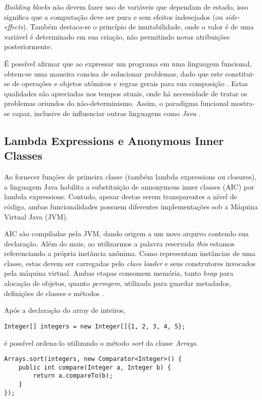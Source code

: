 \documentclass[10pt, conference]{IEEEtran}
\begin{document}
\textit{Building blocks} não devem fazer uso de variáveis que dependam de estado, isso significa que a computação deve ser pura e sem efeitos indesejados (ou \textit{side-effects}). Também destaca-se o princípio de imutabilidade, onde o valor é de uma variável é determinado em sua criação, não permitindo novas atribuições posteriormente.

É possível afirmar que ao expressar um programa em uma linguagem funcional, obtem-se uma maneira concisa de solucionar problemas, dado que este constitui-se de operações e objetos atômicos e regras gerais para sua composição \cite{michaelson2011introduction}. Estas qualidades são apreciadas nos tempos atuais, onde há necessidade de tratar os problemas oriundos do não-determinismo. Assim, o paradigma funcional mostra-se capaz, inclusive de influenciar outras linguagens como \textit{Java} \cite{jsr335}.

\subsection{Lambda Expressions e Anonymous Inner Classes}
Ao fornecer funções de primeira classe (também lambda expressions ou closures), a linguagem Java habilita a substituição de annonymous inner classes (AIC) por lambda expressions. Contudo, apesar destas serem transparentes a nível de código, ambas funcionalidades possuem diferentes implementações sob a Máquina Virtual Java (JVM).

AIC são compiladas pela JVM, dando origem a um novo arquivo contendo sua declaração. Além do mais, ao utilizarmos a palavra reservada \textit{this} estamos referenciando a própria instância anônima. Como representam instâncias de uma classe, estas devem ser carregadas pelo \textit{class loader} e seus construtores invocados pela máquina virtual. Ambas etapas consomem memória, tanto \textit{heap} para alocação de objetos, quanto \emph{permgem}, utilizada para guardar metadados, definições de classes e métodos \cite{hunt2011java}.

Após a declaração do array de inteiros,

\begin{lstlisting}[caption={Array de Inteiros}]
Integer[] integers = new Integer[]{1, 2, 3, 4, 5};
\end{lstlisting}

é possível ordena-lo utilizando o método \textit{sort} da classe \textit{Arrays}.

\begin{lstlisting}[caption={Sort - Anonymous Inner Class}, label={lst:array-aic-sort}]
Arrays.sort(integers, new Comparator<Integer>() {
    public int compare(Integer a, Integer b) {
        return a.compareTo(b);
    }
});
\end{lstlisting}
\end{document}
